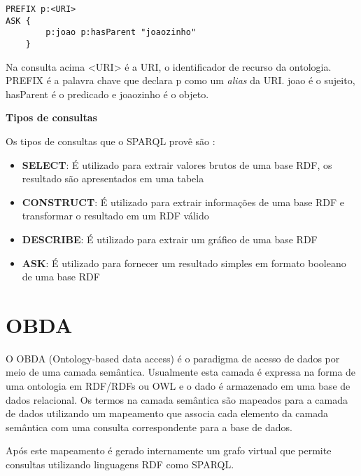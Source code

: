 \lstset{language=SQL,basicstyle=\ttfamily,breaklines=true}
\begin{lstlisting}
PREFIX p:<URI>
ASK {
        p:joao p:hasParent "joaozinho"
    }
\end{lstlisting}

\vskip 0.6cm

Na consulta acima <URI> é a URI, o identificador de recurso da ontologia.
PREFIX é a palavra chave  que declara p como um \textit{alias} da URI. joao é o
sujeito, hasParent é o predicado e joaozinho é o objeto.

\textbf{Tipos de consultas}

Os tipos de consultas que o SPARQL provê são \cite{beckett2006sparql}:

\begin{itemize}

    \item \textbf{SELECT}: É utilizado para extrair valores brutos de uma base
    RDF, os resultado são apresentados em uma tabela

    \item \textbf{CONSTRUCT}: É utilizado para extrair informações de uma base
    RDF e transformar o resultado em um RDF válido

    \item \textbf{DESCRIBE}: É utilizado para extrair um gráfico de uma base
    RDF

    \item \textbf{ASK}: É utilizado para fornecer um resultado simples em formato
    booleano de uma base RDF

\end{itemize}

\section{OBDA}
\label{sec:obda}

O OBDA (Ontology-based data access) \cite{bagosi2014ontop} é o paradigma de acesso
de dados por meio de uma camada semântica. Usualmente esta camada é expressa na
forma de uma ontologia em RDF/RDFs ou OWL e o dado é armazenado em uma base de
dados relacional. Os termos na camada semântica são mapeados para a camada de
dados utilizando um mapeamento que associa cada elemento da camada semântica com
uma consulta correspondente para a base de dados.

Após este mapeamento é gerado internamente um grafo virtual que permite consultas
utilizando linguagens RDF como SPARQL.

